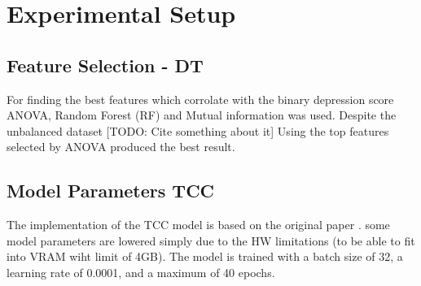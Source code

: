 \section{Experimental Setup}
\subsection{Feature Selection - DT}

For finding the best features which corrolate with the binary depression score ANOVA, Random Forest (RF) and Mutual information was used. Despite the unbalanced dataset [TODO: Cite something about it] Using the top features selected by ANOVA produced the best result. 

\subsection{Model Parameters TCC}

The implementation of the TCC model is based on the original paper \cite{tcc}. some model parameters are lowered simply due to the HW limitations (to be able to fit into VRAM wiht limit of 4GB). The model is trained with a batch size of 32, a learning rate of 0.0001, and a maximum of 40 epochs. 

